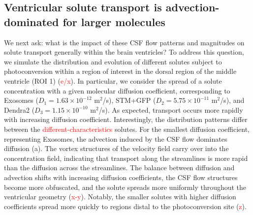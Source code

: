 \documentclass[fleqn]{wlscirep}
\newcommand{\fixme}[1]{\textcolor{red}{#1}}
\begin{document}
\subsection*{Ventricular solute transport is advection-dominated for larger molecules}
We next ask: what is the impact of these CSF flow patterns and
magnitudes on solute transport generally within the brain ventricles?
To address this question, we simulate the distribution and evolution
of different solutes subject to photoconversion within a region of
interest in the dorsal region of the middle ventricle (ROI 1)
(\fixme{e/x}). In particular, we consider the spread of
a solute concentration with a given molecular diffusion coefficient,
corresponding to Exosomes ($D_1 = 1.63 \times 10^{-12}$ m$^2$/s),
STM+GFP ($D_2 = 5.75 \times 10^{-11}$ m$^2$/s), and Dendra2 ($D_3 =
1.15 \times 10^{-10}$ m$^2$/s). As expected, transport occurs more
rapidly with increasing diffusion coefficient. Interestingly, the
distribution patterns differ between the \fixme{different-characteristics}
solutes. For the smallest diffusion coefficient, representing
Exosomes, the advection induced by the CSF flow dominates diffusion
(a). The vortex structures of the velocity field
carry over into the concentration field, indicating that transport
along the streamlines is more rapid than the diffusion across the
streamlines. The balance between diffusion and advection shifts with
increasing diffusion coefficients, the CSF flow structures become more
obfuscated, and the solute spreads more uniformly throughout the
ventricular geometry (\fixme{x-y}). Notably, the
smaller solutes with higher diffusion coefficients spread more quickly
to regions distal to the photoconversion site (\fixme{z}).
\end{document}
